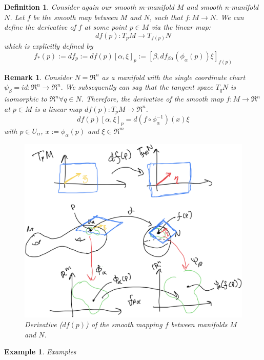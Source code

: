 \documentclass{article}
\newtheorem{definition}{Definition}
\newtheorem{remark}{Remark}
\newtheorem{example}{Example}
\begin{document}
\begin{definition}
    Consider again our smooth m-manifold $M$ and smooth n-manifold $N$. Let $f$ be the smooth map between $M$ and $N$, such that $f:M\rightarrow N$. We can define the derivative of $f$ at some point $p\in M$ via the linear map: 
    $$df(p): T_{p}M\rightarrow T_{f(p)}N$$
    which is explicitly defined by
    $$f_{*}(p):= df_{p}:=df(p)[\alpha, \xi]_{p}:= [\beta, df_{\beta \alpha}(\phi_{\alpha}(p))\xi]_{f(p)}$$
\end{definition}

\begin{remark}
    Consider $N=\Re^{n}$ as a manifold with the single coordinate chart $\psi_{\beta} = id: \Re^{n}\rightarrow \Re^{n}.$ We subsequently can say that the tangent space $T_{q}N$ is isomorphic to $\Re^{n} \forall q \in N$.
    Therefore, the derivative of the smooth map $f:M \rightarrow \Re^{n}$ at $p \in M$ is a linear map $df(p): T_{p}M\rightarrow \Re^{n}$. 
    $$df(p)[\alpha, \xi]_{p} = d(f \circ \phi^{-1}_{\alpha})(x)\xi$$ with $p \in U_{\alpha}$, $x:= \phi_{\alpha}(p)$ and $\xi \in \Re^{m}$
    \begin{figure}[hbt!]
        \centering
        \includegraphics[width=0.65\linewidth]{figures/derivative_of_smooth_maps.PNG}
        \caption{Derivative ($df(p)$) of the smooth mapping $f$ between manifolds $M$ and $N$.}
        \label{fig:derivative_smooth_map}
    \end{figure}
\end{remark}

\begin{example}
    Examples
\end{example}





\end{document}
